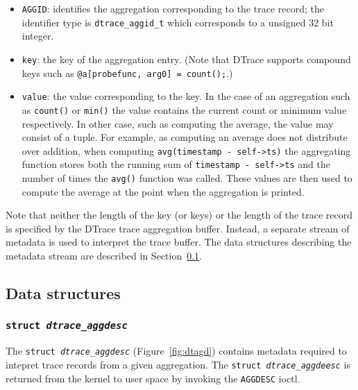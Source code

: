 \begin{itemize}

	\item{\texttt{AGGID}}: identifies the aggregation corresponding to the
trace record; the identifier type is \texttt{dtrace\_aggid\_t} which corresponds
to a unsigned 32 bit integer.

	\item{\texttt{key}:} the key of the aggregation entry. (Note that
DTrace supports compound keys such as \texttt{@a[probefunc, arg0] = count();}.)

	\item{\texttt{value}:} the value corresponding to the key. In the case of
an aggregation such as \texttt{count()} or \texttt{min()} the value contains
the current count or minimum value respectively. In other case, such as
computing the average, the value may consist of a tuple. For example, as
computing an average does not distribute over addition, when computing
\texttt{avg(timestamp - self->ts)} the aggregating function stores both the
running sum of \texttt{timestamp - self->ts} and the number of times the
\texttt{avg()} function was called. These values are then used to compute the
average at the point when the aggregation is printed.

\end{itemize}

Note that neither the length of the key (or keys) or the length of the trace
record is specified by the DTrace trace aggregation buffer.
Instead, a separate stream of metadata is used to interpret the trace buffer.
The data structures describing the metadata stream are described in
Section~\ref{subsec:agg_data_structures}.

\subsection{Data structures}
\label{subsec:agg_data_structures}

\subsubsection{\texttt{struct~\textit{dtrace\_aggdesc}}}
\label{subsubsec:dtagd}

The \texttt{struct~\textit{dtrace\_aggdesc}} (Figure~\ref{fig:dtagd}) contains
metadata required to intepret trace records from a given aggregation.  The
\texttt{struct~\textit{dtrace\_aggdeesc}} is returned from the kernel to user
space by invoking the \texttt{AGGDESC} ioctl.

